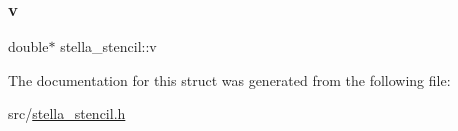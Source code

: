 \subsubsection{\texorpdfstring{v}{v}}
{\footnotesize\ttfamily double$\ast$ stella\+\_\+stencil\+::v}



The documentation for this struct was generated from the following file\+:\begin{DoxyCompactItemize}
\item 
src/\mbox{\hyperlink{stella__stencil_8h}{stella\+\_\+stencil.\+h}}\end{DoxyCompactItemize}
